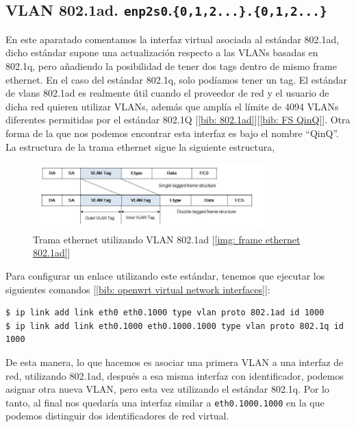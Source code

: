 \documentclass[12pt]{article}
\begin{document}
	\pagebreak
	
	\subsection{VLAN 802.1ad. \texttt{enp2s0}.\texttt{\{0,1,2...\}.\{0,1,2...\}}}
	\noindent En este aparatado comentamos la interfaz virtual asociada al estándar 802.1ad, dicho estándar supone una actualización respecto a las VLANs basadas en 802.1q, pero añadiendo la posibilidad de tener dos tags dentro de mismo frame ethernet. En el caso del estándar 802.1q, solo podíamos tener un tag. El estándar de vlans 802.1ad es realmente útil cuando el proveedor de red y el usuario de dicha red quieren utilizar VLANs, además que amplía el límite de 4094 VLANs diferentes permitidas por el estándar 802.1Q [\ref{bib: 802.1ad}][\ref{bib: FS QinQ}]. Otra forma de la que nos podemos encontrar esta interfaz es bajo el nombre ``QinQ''. \\
	
	\noindent La estructura de la trama ethernet sigue la siguiente estructura,
	
	\begin{figure}[h]
		\begin{center}
			\includegraphics[width=0.8\textwidth]{img/ethernet_8021ad.png}
			\caption{Trama ethernet utilizando VLAN 802.1ad [\ref{img: frame ethernet 802.1ad}]}
			\label{ethernet 802.1ad}
		\end{center}
	\end{figure}
	
	\noindent Para configurar un enlace utilizando este estándar, tenemos que ejecutar los siguientes comandos [\ref{bib: openwrt virtual network interfaces}]:
	\begin{verbatim}
$ ip link add link eth0 eth0.1000 type vlan proto 802.1ad id 1000
$ ip link add link eth0.1000 eth0.1000.1000 type vlan proto 802.1q id 1000
 	\end{verbatim}
 
 	\noindent De esta manera, lo que hacemos es asociar una primera VLAN a una interfaz de red, utilizando 802.1ad, después a esa misma interfaz con identificador, podemos asignar otra nueva VLAN, pero esta vez utilizando el estándar 802.1q. Por lo tanto, al final nos quedaría una interfaz similar a \texttt{eth0.1000.1000} en la que podemos distinguir dos identificadores de red virtual.
	
\end{document}
